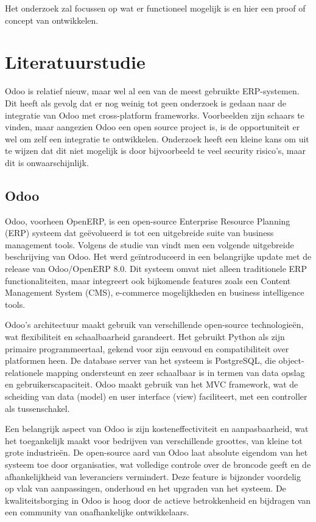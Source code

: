  

Het onderzoek zal focussen op wat er functioneel mogelijk is en hier een proof of concept van ontwikkelen.


\section{Literatuurstudie}%
\label{sec:literatuurstudie}

Odoo is relatief nieuw, maar wel al een van de
meest gebruikte ERP-systemen.
Dit heeft als gevolg dat er nog weinig tot geen onderzoek is gedaan naar de integratie van Odoo met cross-platform frameworks.
Voorbeelden zijn schaars te vinden, maar aangezien Odoo een open source project is, is de opportuniteit er wel om zelf een integratie te ontwikkelen.
Onderzoek heeft een kleine kans om uit te wijzen dat dit niet mogelijk is door bijvoorbeeld te veel security risico's, maar dit is onwaarschijnlijk.

\subsection{Odoo}%
\label{subsec:odoo}
Odoo, voorheen OpenERP, is een open-source Enterprise Resource Planning (ERP) systeem dat geëvolueerd is tot een uitgebreide suite van business management tools.
Volgens de studie van \textcite{GaneshEtAl2016} vindt men een volgende uitgebreide beschrijving van Odoo.
Het werd geïntroduceerd in een belangrijke update met de release van Odoo/OpenERP 8.0.
Dit systeem omvat niet alleen traditionele ERP functionaliteiten, maar integreert ook bijkomende features zoals een Content Management System (CMS), e-commerce mogelijkheden en business intelligence tools.

Odoo's architectuur maakt gebruik van verschillende open-source technologieën, wat flexibiliteit en schaalbaarheid garandeert.
Het gebruikt Python als zijn primaire programmeertaal, gekend voor zijn eenvoud en compatibiliteit over platformen heen.
De database server van het systeem is PostgreSQL, die object-relationele mapping ondersteunt en zeer schaalbaar is in termen van data opslag en gebruikerscapaciteit.
Odoo maakt gebruik van het MVC framework, wat de scheiding van data (model) en user interface (view) faciliteert, met een controller als tussenschakel.

Een belangrijk aspect van Odoo is zijn kosteneffectiviteit en aanpasbaarheid, wat het toegankelijk maakt voor bedrijven van verschillende groottes, van kleine tot grote industrieën.
De open-source aard van Odoo laat absolute eigendom van het systeem toe door organisaties, wat volledige controle over de broncode geeft en de afhankelijkheid van leveranciers vermindert.
Deze feature is bijzonder voordelig op vlak van aanpassingen, onderhoud en het upgraden van het systeem.
De kwaliteitsborging in Odoo is hoog door de actieve betrokkenheid en bijdragen van een community van onafhankelijke ontwikkelaars.

